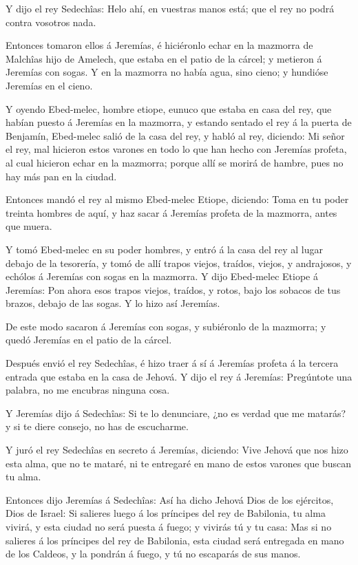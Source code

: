  Y dijo el rey Sedechîas: Helo ahí, en vuestras manos está;
que el rey no podrá contra vosotros nada.

 Entonces tomaron ellos á Jeremías, é hiciéronlo echar en la
mazmorra de Malchîas hijo de Amelech, que estaba en el patio de la
cárcel; y metieron á Jeremías con sogas. Y en la mazmorra no había agua,
sino cieno; y hundióse Jeremías en el cieno.

 Y oyendo Ebed-melec, hombre etiope, eunuco que estaba en
casa del rey, que habían puesto á Jeremías en la mazmorra, y estando
sentado el rey á la puerta de Benjamín,  Ebed-melec salió de
la casa del rey, y habló al rey, diciendo:  Mi señor el rey,
mal hicieron estos varones en todo lo que han hecho con Jeremías
profeta, al cual hicieron echar en la mazmorra; porque allí se morirá de
hambre, pues no hay más pan en la ciudad.

 Entonces mandó el rey al mismo Ebed-melec Etiope,
diciendo: Toma en tu poder treinta hombres de aquí, y haz sacar á
Jeremías profeta de la mazmorra, antes que muera.

 Y tomó Ebed-melec en su poder hombres, y entró á la casa
del rey al lugar debajo de la tesorería, y tomó de allí trapos viejos,
traídos, viejos, y andrajosos, y echólos á Jeremías con sogas en la
mazmorra.  Y dijo Ebed-melec Etiope á Jeremías: Pon ahora
esos trapos viejos, traídos, y rotos, bajo los sobacos de tus brazos,
debajo de las sogas. Y lo hizo así Jeremías.

 De este modo sacaron á Jeremías con sogas, y subiéronlo de
la mazmorra; y quedó Jeremías en el patio de la cárcel.

 Después envió el rey Sedechîas, é hizo traer á sí á
Jeremías profeta á la tercera entrada que estaba en la casa de Jehová. Y
dijo el rey á Jeremías: Pregúntote una palabra, no me encubras ninguna
cosa.

 Y Jeremías dijo á Sedechîas: Si te lo denunciare, ¿no es
verdad que me matarás? y si te diere consejo, no has de escucharme.

 Y juró el rey Sedechîas en secreto á Jeremías, diciendo:
Vive Jehová que nos hizo esta alma, que no te mataré, ni te entregaré en
mano de estos varones que buscan tu alma.

 Entonces dijo Jeremías á Sedechîas: Así ha dicho Jehová
Dios de los ejércitos, Dios de Israel: Si salieres luego á los príncipes
del rey de Babilonia, tu alma vivirá, y esta ciudad no será puesta á
fuego; y vivirás tú y tu casa:  Mas si no salieres á los
príncipes del rey de Babilonia, esta ciudad será entregada en mano de
los Caldeos, y la pondrán á fuego, y tú no escaparás de sus manos.

